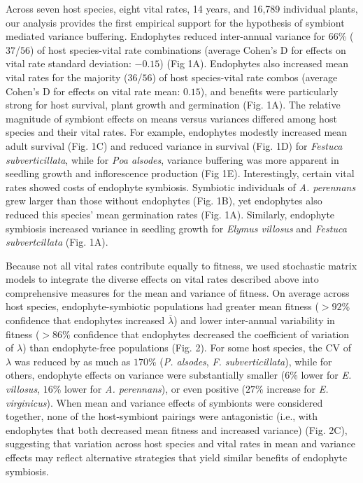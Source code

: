 \documentclass[12pt]{article}
\begin{document}
Across seven host species, eight vital rates, 14 years, and 16,789 individual plants, our analysis provides the first empirical support for the hypothesis of symbiont mediated variance buffering. 
Endophytes reduced inter-annual variance for 66\% ($37$/$56$) of host species-vital rate combinations (average Cohen's D for effects on vital rate standard deviation: $-0.15$) (Fig 1A). 
Endophytes also increased mean vital rates for the majority ($36$/$56$) of host species-vital rate combos (average Cohen's D for effects on vital rate mean: $0.15$), and benefits were particularly strong for host survival, plant growth and germination (Fig. 1A).
The relative magnitude of symbiont effects on means versus variances differed among host species and their vital rates.
For example, endophytes modestly increased mean adult survival (Fig. 1C) and reduced variance in survival (Fig. 1D) for \emph{Festuca subverticillata}, while for \emph{Poa alsodes}, variance buffering was more apparent in seedling growth and inflorescence production (Fig 1E). 
Interestingly, certain vital rates showed costs of endophyte symbiosis. 
Symbiotic individuals of \emph{A. perennans} grew larger than those without endophytes (Fig. 1B), yet endophytes also reduced this species' mean germination rates (Fig. 1A). 
Similarly, endophyte symbiosis increased variance in seedling growth for \emph{Elymus villosus} and \emph{Festuca subvertcillata} (Fig. 1A).
 
 Because not all vital rates contribute equally to fitness, we used stochastic matrix models to integrate the diverse effects on vital rates described above into comprehensive measures for the mean and variance of fitness. 
 On average across host species, endophyte-symbiotic populations had greater mean fitness ($>92$\% confidence that endophytes increased $\overline{\lambda}$) and lower inter-annual variability in fitness ($>86$\% confidence that endophytes decreased the coefficient of variation of $\lambda$) than endophyte-free populations (Fig. 2).
For some host species, the CV of $\lambda$ was reduced by as much as $170$\% (\emph{P. alsodes}, \emph{F. subverticillata}), while for others, endophyte effects on variance were substantially smaller ($6$\% lower for \emph{E. villosus}, $16$\% lower for \emph{A. perennans}), or even positive ($27$\% increase for \emph{E. virginicus}).
When mean and variance effects of symbionts were considered together, none of the host-symbiont pairings were antagonistic (i.e., with endophytes that both decreased mean fitness and increased variance) (Fig. 2C), suggesting that variation across host species and vital rates in mean and variance effects may reflect alternative strategies that yield similar benefits of endophyte symbiosis.
\end{document}
